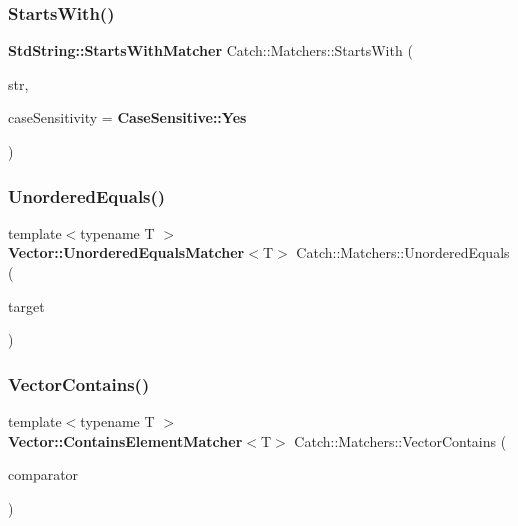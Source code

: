 \mbox{\label{namespace_catch_1_1_matchers_a97c9ee09a70378ca7e8c6f9f01b0d6d1}} 
\subsubsection{StartsWith()}
{\footnotesize\ttfamily \textbf{ Std\+String\+::\+Starts\+With\+Matcher} Catch\+::\+Matchers\+::\+Starts\+With (\begin{DoxyParamCaption}\item[{std\+::string const \&}]{str,  }\item[{\textbf{ Case\+Sensitive\+::\+Choice}}]{case\+Sensitivity = {\ttfamily \textbf{ Case\+Sensitive\+::\+Yes}} }\end{DoxyParamCaption})}

\mbox{\label{namespace_catch_1_1_matchers_a3eced3a4f580478f4c5e67ed7e2915df}} 
\subsubsection{UnorderedEquals()}
{\footnotesize\ttfamily template$<$typename T $>$ \\
\textbf{ Vector\+::\+Unordered\+Equals\+Matcher}$<$T$>$ Catch\+::\+Matchers\+::\+Unordered\+Equals (\begin{DoxyParamCaption}\item[{std\+::vector$<$ T $>$ const \&}]{target }\end{DoxyParamCaption})}

\mbox{\label{namespace_catch_1_1_matchers_ae8db5846328116fb36386893deaec944}} 
\subsubsection{VectorContains()}
{\footnotesize\ttfamily template$<$typename T $>$ \\
\textbf{ Vector\+::\+Contains\+Element\+Matcher}$<$T$>$ Catch\+::\+Matchers\+::\+Vector\+Contains (\begin{DoxyParamCaption}\item[{T const \&}]{comparator }\end{DoxyParamCaption})}

